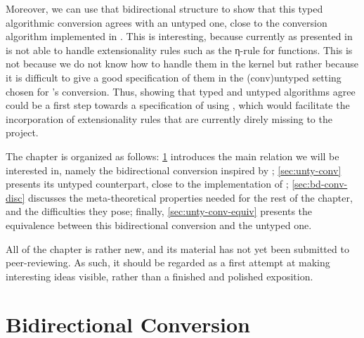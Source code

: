Moreover, we can use that bidirectional structure
to show that this typed algorithmic conversion agrees with an untyped one,
close to the conversion algorithm implemented in .
This is interesting, because currently  as presented in 
is not able to handle extensionality rules such as the η-rule for functions.
This is not because we do not know how to handle them in the kernel%
but rather because it is difficult to give a good specification of them in the
\kl(conv){untyped} setting chosen for ’s conversion.%
%
Thus, showing that typed and untyped algorithms agree could be a first step towards a specification of
 using , which would facilitate the incorporation of
extensionality rules that are currently direly missing to the project.

The chapter is organized as follows: \cref{sec:bidir-conv} introduces the main relation we will
be interested in, namely the bidirectional conversion inspired by \textcite{Abel2017};
\cref{sec:unty-conv} presents its untyped counterpart, close to the implementation of ;
\cref{sec:bd-conv-disc} discusses the meta-theoretical properties needed for the rest of
the chapter, and the difficulties they pose;
finally, \cref{sec:unty-conv-equiv} presents the equivalence
between this bidirectional conversion and the untyped one.

All of the chapter is rather new, and its material has not yet been submitted to peer-reviewing.
As such, it should be regarded as a first attempt at making interesting ideas visible,
rather than a finished and polished exposition.

\section{Bidirectional Conversion}
\label{sec:bidir-conv}

